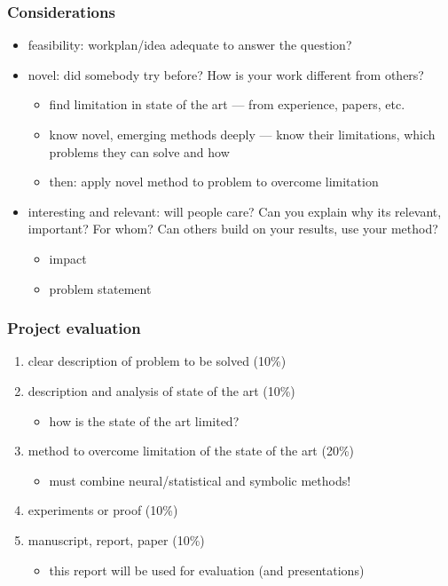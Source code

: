 \documentclass{beamer}
\begin{document}
\begin{frame}
  \frametitle{Considerations}
  \begin{itemize}
  \item feasibility: workplan/idea adequate to answer the question?
  \item novel: did somebody try before? How is your work different
    from others?
    \begin{itemize}
    \item find limitation in state of the art --- from experience,
      papers, etc.
    \item know novel, emerging methods deeply --- know their
      limitations, which problems they can solve and how
    \item then: apply novel method to problem to overcome limitation
    \end{itemize}
    \pause
  \item interesting and relevant: will people care? Can you explain
    why its relevant, important? For whom? Can others build on your
    results, use your method?
    \begin{itemize}
    \item impact
    \item problem statement
    \end{itemize}
  \end{itemize}
\end{frame}

\begin{frame}
  \frametitle{Project evaluation}
  \begin{enumerate}
  \item clear description of problem to be solved (10\%)
  \item description and analysis of state of the art (10\%)
    \begin{itemize}
    \item how is the state of the art limited?
    \end{itemize}
  \item method to overcome limitation of the state of the art (20\%)
    \begin{itemize}
    \item must combine neural/statistical and symbolic methods!
    \end{itemize}
  \item experiments or proof (10\%)
  \item manuscript, report, paper (10\%)
    \begin{itemize}
    \item this report will be used for evaluation (and presentations)
    \end{itemize}
  \end{enumerate}
\end{frame}
\end{document}

